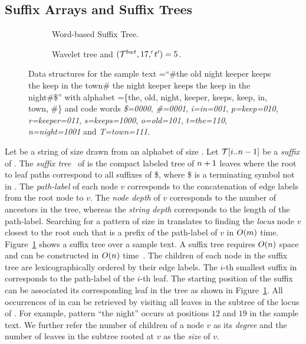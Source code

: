 
\subsection{Suffix Arrays and Suffix Trees}

\begin{figure*}[phbt]
\begin{subfigure}[t]{0.5\textwidth}
\centering

\caption{Word-based Suffix Tree.}
\label{fig-suffix-tree}
\end{subfigure}
\quad
\begin{subfigure}[t]{0.5\textwidth}
\centering

\caption{Wavelet tree and \rankop$(\mathcal{T}^{bwt},17,'t')=5$.}
\label{fig-wt-bwt}
\end{subfigure}
\begin{subfigure}[b]{1\textwidth}
\centering

\label{fig-sa-bwt}
\end{subfigure}
\vspace{-0.8cm}
\caption{Data structures for the sample text {\col=``\#the old night keeper 
keeps the keep in the town\# the night keeper keeps the keep in the night\#\$}'' with alphabet {\alphabet=\{the, old, night, keeper, keeps, keep, in, town, \#\}} and code words {\em \$=0000}, {\em \#=0001}, 
{\em i=in=001}, {\em p=keep=010}, {\em r=keeper=011}, {\em s=keeps=1000}, 
{\em o=old=101}, {\em t=the=110}, {\em n=night=1001} and {\em T=town=111}.}
\label{fig-example}
\end{figure*}

Let {\col} be a string of size {\collen} drawn from an alphabet {\alphabet} of
size {\alphabetsize}. Let {$\mathcal{T}[i..n-1]$} be a {\it suffix} of {\col}.
The {\it suffix tree}~\cite{w-swat73} of {\col} is the compact labeled
tree of $n+1$ leaves where the root to leaf paths correspond to all suffixes of {\col\$},
where \$ is a terminating symbol not in {\alphabet}. The {\it path-label}
of each node $v$ corresponds to the concatenation of edge labels from the
root node to $v$. The {\it node depth} of $v$ corresponds to the number
of ancestors in the tree, whereas the {\it string depth} corresponds to the
length of the path-label. Searching for a pattern {\pattern} of 
size {\plen} in {\col} translates to finding the {\it locus} node $v$ closest to
the root such that {\pattern} is a prefix of the path-label of $v$ in $O(m)$ time.
Figure~\ref{fig-suffix-tree} shows a suffix tree over a sample text. 
A suffix tree requires $O(n)$ space 
and can be constructed in $O(n)$ time~\cite{u-algo95}. The children
of each node in the suffix tree are lexicographically ordered by their edge labels.
The $i$-th smallest suffix in {\col} corresponds to the path-label of the $i$-th 
leaf. The starting position of the suffix can be associated its corresponding
leaf in the tree as shown in Figure~\ref{fig-suffix-tree}. All 
occurrences of {\pattern} in {\col} can be retrieved by visiting all leaves
in the subtree of the locus of {\pattern}. For example, pattern ``the night'' occurs
at positions $12$ and $19$ in the sample text. We further refer the number of children
of a node $v$ as its {\it degree} and the number of leaves in the subtree rooted at $v$
as the {\it size} of $v$.

